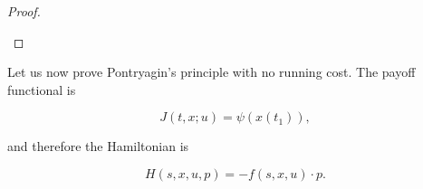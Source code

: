 \begin{lemma}
\begin{proof}
\begin{itemize}
            \color{red}{If $s>r$ then: FARE}


        \end{itemize}
    \end{proof}
\end{lemma}

Let us now prove Pontryagin's principle with no running cost. The payoff functional is

\begin{equation}\label{1-proofpontry-norunfunct}
    J(t,x;u) = \psi(x(t_1)),
\end{equation}

and therefore the Hamiltonian is

\begin{equation}\label{1-proofpontry-norunham}
    H(s,x,u,p) = - f(s,x,u)\cdot p. 
\end{equation}


